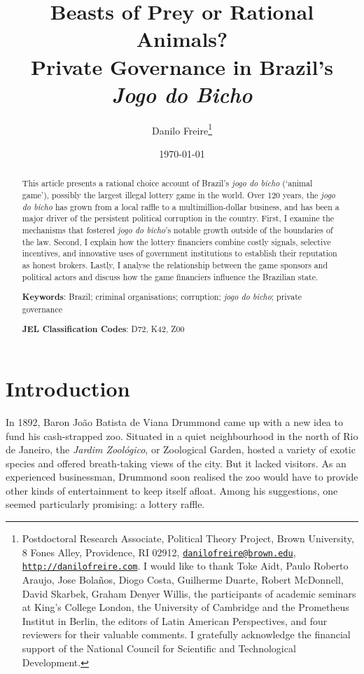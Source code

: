 \documentclass[a4paper,12pt]{article}
\title{\textbf{Beasts of Prey or Rational Animals?\\ Private Governance in Brazil's \emph{Jogo do Bicho}}}
\author{Danilo Freire\thanks{Postdoctoral Research Associate, Political Theory Project, Brown University, 8 Fones Alley, Providence, RI 02912, \href{mailto:danilofreire@brown.edu}{\texttt{danilofreire@brown.edu}}, \href{http://danilofreire.com}{\texttt{http://danilofreire.com}}. I would like to thank Toke Aidt, Paulo Roberto Araujo, Jose Bola\~{n}os, Diogo Costa, Guilherme Duarte, Robert McDonnell, David Skarbek, Graham Denyer Willis, the participants of academic seminars at King's College London, the University of Cambridge and the Prometheus Institut in Berlin, the editors of Latin American Perspectives, and four reviewers for their valuable comments. I gratefully acknowledge the financial support of the National Council for Scientific and Technological Development.}
}
\date{\today}
\begin{document}
\maketitle

\begin{abstract}
 \noindent
This article presents a rational choice account of Brazil's \emph{jogo do bicho} (`animal game'), possibly the largest illegal lottery game in the world. Over 120 years, the \emph{jogo do bicho} has grown from a local raffle to a multimillion-dollar business, and has been a major driver of the persistent political corruption in the country. First, I examine the mechanisms that fostered \emph{jogo do bicho}'s notable growth outside of the boundaries of the law. Second, I explain how the lottery financiers combine costly signals, selective incentives, and innovative uses of government institutions to establish their reputation as honest brokers. Lastly, I analyse the relationship between the game sponsors and political actors and discuss how the game financiers influence the Brazilian state.       

 \vspace{.5cm}
 \noindent
 \textbf{Keywords}: Brazil; criminal organisations; corruption; \emph{jogo do bicho}; private governance
  
 \vspace{.25cm}
 \noindent
 \textbf{JEL Classification Codes}: D72, K42, Z00
\end{abstract}

\newpage

\section{Introduction}
\label{sec:intro}

In 1892, Baron João Batista de Viana Drummond came up with a new idea to fund his cash-strapped zoo. Situated in a quiet neighbourhood in the north of Rio de Janeiro, the \emph{Jardim Zoológico}, or Zoological Garden, hosted a variety of exotic species and offered breath-taking views of the city. But it lacked visitors. As an experienced businessman, Drummond soon realised the zoo would have to provide other kinds of entertainment to keep itself afloat. Among his suggestions, one seemed particularly promising: a lottery raffle.
\end{document}
